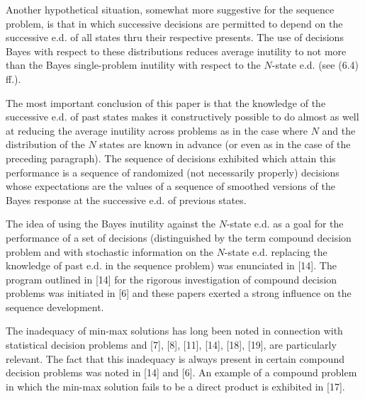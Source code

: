 \documentclass[11pt]{article}
\theoremstyle{boldStyle}
\begin{document}
Another hypothetical situation, somewhat more suggestive for the sequence problem, is that in which successive decisions are permitted to depend on the successive e.d. 
of all states thru their respective presents. The use of decisions Bayes with respect to these distributions reduces average inutility to not more than the 
Bayes single-problem inutility with respect to the \( N \)-state e.d. (see (6.4) ff.).

\medbreak

The most important conclusion of this paper is that the knowledge of the successive e.d. of past states makes it constructively possible 
to do almost as well at reducing the average inutility across problems as in the case where \( N \) and the distribution of the \( N \) 
states are known in advance (or even as in the case of the preceding paragraph). 
The sequence of decisions exhibited which attain this performance is a sequence of randomized (not necessarily properly) decisions 
whose expectations are the values of a sequence of smoothed versions of the Bayes response at the successive e.d. of previous states.

\medbreak

The idea of using the Bayes inutility against the \( N \)-state e.d. as a goal for the performance of a set of decisions 
(distinguished by the term compound decision problem and with stochastic information on the \( N \)-state e.d. replacing the knowledge 
of past e.d. in the sequence problem) was enunciated in [14]. 
The program outlined in [14] for the rigorous investigation of compound decision problems was initiated in [6] and 
these papers exerted a strong influence on the sequence development.

\medbreak

The inadequacy of min-max solutions has long been noted in connection with statistical decision problems and [7], [8], [11], [14], [18], [19], are particularly relevant. The fact that this inadequacy is always present in certain compound decision problems was noted in [14] and [6]. An example of a compound problem in which the min-max solution fails to be a direct product is exhibited in [17].



\end{document}
